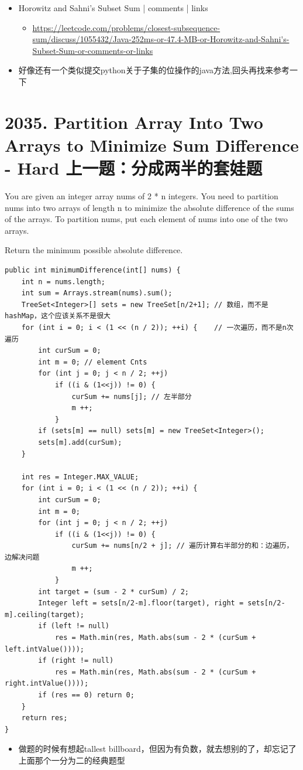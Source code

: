 \documentclass[9pt, b5paaper]{book}
\begin{document}
\begin{itemize}
\item Horowitz and Sahni's Subset Sum | comments | links
\begin{itemize}
\item \url{https://leetcode.com/problems/closest-subsequence-sum/discuss/1055432/Java-252ms-or-47.4-MB-or-Horowitz-and-Sahni's-Subset-Sum-or-comments-or-links}
\end{itemize}
\item 好像还有一个类似提交python关于子集的位操作的java方法,回头再找来参考一下
\end{itemize}

\section{2035. Partition Array Into Two Arrays to Minimize Sum Difference - Hard 上一题：分成两半的套娃题}
\label{sec-11-16}
You are given an integer array nums of 2 * n integers. You need to partition nums into two arrays of length n to minimize the absolute difference of the sums of the arrays. To partition nums, put each element of nums into one of the two arrays.

Return the minimum possible absolute difference.
\begin{verbatim}
public int minimumDifference(int[] nums) {
    int n = nums.length;
    int sum = Arrays.stream(nums).sum();
    TreeSet<Integer>[] sets = new TreeSet[n/2+1]; // 数组，而不是hashMap，这个应该关系不是很大
    for (int i = 0; i < (1 << (n / 2)); ++i) {    // 一次遍历，而不是n次遍历
        int curSum = 0;
        int m = 0; // element Cnts                         
        for (int j = 0; j < n / 2; ++j) 
            if ((i & (1<<j)) != 0) {
                curSum += nums[j]; // 左半部分
                m ++;
            }
        if (sets[m] == null) sets[m] = new TreeSet<Integer>();
        sets[m].add(curSum);
    }

    int res = Integer.MAX_VALUE;
    for (int i = 0; i < (1 << (n / 2)); ++i) {
        int curSum = 0;
        int m = 0;
        for (int j = 0; j < n / 2; ++j) 
            if ((i & (1<<j)) != 0) {
                curSum += nums[n/2 + j]; // 遍历计算右半部分的和：边遍历，边解决问题
                m ++;
            }
        int target = (sum - 2 * curSum) / 2;
        Integer left = sets[n/2-m].floor(target), right = sets[n/2-m].ceiling(target);
        if (left != null) 
            res = Math.min(res, Math.abs(sum - 2 * (curSum + left.intValue())));
        if (right != null) 
            res = Math.min(res, Math.abs(sum - 2 * (curSum + right.intValue())));
        if (res == 0) return 0;
    }
    return res;
}
\end{verbatim}
\begin{itemize}
\item 做题的时候有想起tallest billboard，但因为有负数，就去想别的了，却忘记了上面那个一分为二的经典题型
\end{itemize}
\end{document}
